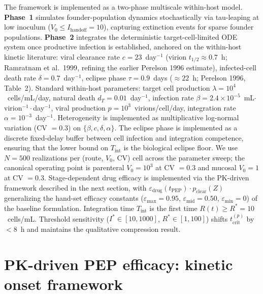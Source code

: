 \documentclass[10pt,letterpaper]{article}
\theoremstyle{definition}
\theoremstyle{remark}
\newcommand{\Tint}{T_{\text{int}}}
\newcommand{\tcrit}{t_{\text{crit}}}
\newcommand{\emax}{\varepsilon_{\max}}
\newcommand{\emid}{\varepsilon_{\text{mid}}}
\newcommand{\emin}{\varepsilon_{\min}}
\begin{document}
The framework is implemented as a two-phase multiscale within-host model. \textbf{Phase~1} simulates founder-population dynamics stochastically via tau-leaping at low inoculum ($V_{0} \leq I_{\text{handoff}} = 10$), capturing extinction events for sparse founder populations. \textbf{Phase~2} integrates the deterministic target-cell-limited ODE system once productive infection is established, anchored on the within-host kinetic literature: viral clearance rate $c = 23$~day$^{-1}$ (virion $t_{1/2} \approx 0.7$~h; Ramratnam et al.\ 1999\cite{ramratnam1999}, refining the earlier Perelson 1996\cite{perelson1996} estimate), infected-cell death rate $\delta = 0.7$~day$^{-1}$\cite{perelson1996}, eclipse phase $\tau = 0.9$~days ($\approx 22$~h; Perelson 1996, Table~2). Standard within-host parameters\cite{mcmichael2010}: target cell production $\lambda = 10^{4}$~cells/mL/day, natural death $d_{T} = 0.01$~day$^{-1}$, infection rate $\beta = 2.4 \times 10^{-5}$~mL$\cdot$virion$^{-1}\cdot$day$^{-1}$, viral production $p = 10^{3}$~virions/cell/day, integration rate $\alpha = 10^{-3}$~day$^{-1}$. Heterogeneity is implemented as multiplicative log-normal variation (CV $= 0.3$) on $\{\beta, c, \delta, \alpha\}$. The eclipse phase is implemented as a discrete fixed-delay buffer between cell infection and integration competence, ensuring that the lower bound on $\Tint$ is the biological eclipse floor. We use $N = 500$ realizations per (route, $V_{0}$, CV) cell across the parameter sweep; the canonical operating point is parenteral $V_{0} = 10^{3}$ at CV $= 0.3$ and mucosal $V_{0} = 1$ at CV $= 0.3$. Stage-dependent drug efficacy is implemented via the PK-driven framework described in the next section, with $\varepsilon_{\text{drug}}(t_{\text{PEP}}) \cdot p_{\text{clear}}(Z)$ generalizing the hand-set efficacy constants ($\emax = 0.95$, $\emid = 0.50$, $\emin = 0$) of the baseline formulation. Integration time $\Tint$ is the first time $R(t) \geq R^{*} = 10$~cells/mL. Threshold sensitivity ($I^{*} \in [10, 1000]$, $R^{*} \in [1, 100]$) shifts $\tcrit^{(p)}$ by $<8$~h and maintains the qualitative compression result.

\section*{PK-driven PEP efficacy: kinetic onset framework}
\end{document}
